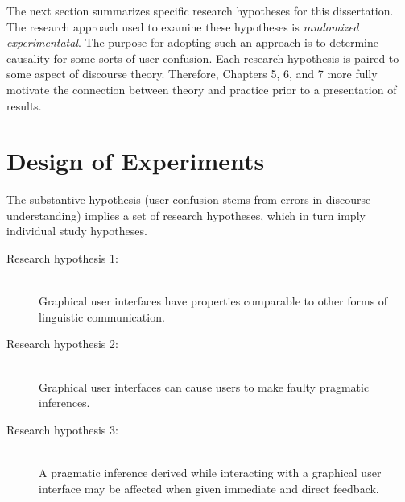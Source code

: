 The next section summarizes specific research hypotheses for this dissertation. The research approach used to examine these hypotheses is \emph{randomized experimentatal}. The purpose for adopting such an approach is to determine causality for some sorts of user confusion. Each research hypothesis is paired to some aspect of discourse theory. Therefore, Chapters 5, 6, and 7 more fully motivate the connection between theory and practice prior to a presentation of results.

\section{Design of Experiments}
\label{designofexperiments}

The substantive hypothesis (user confusion stems from errors in discourse understanding) implies a set of research hypotheses, which in turn imply individual study hypotheses.

\begin{description}
\item[Research hypothesis 1:] \hfill \\ 
Graphical user interfaces have properties comparable to other forms of linguistic communication. 

\item[Research hypothesis 2:] \hfill \\
Graphical user interfaces can cause users to make faulty pragmatic inferences.

\item[Research hypothesis 3:] \hfill \\
A pragmatic inference derived while interacting with a graphical user interface may be affected when given immediate and direct feedback.
\end{description}

